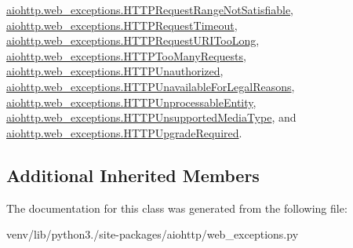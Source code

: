 \hyperlink{classaiohttp_1_1web__exceptions_1_1_h_t_t_p_request_range_not_satisfiable}{aiohttp.\+web\+\_\+exceptions.\+H\+T\+T\+P\+Request\+Range\+Not\+Satisfiable}, \hyperlink{classaiohttp_1_1web__exceptions_1_1_h_t_t_p_request_timeout}{aiohttp.\+web\+\_\+exceptions.\+H\+T\+T\+P\+Request\+Timeout}, \hyperlink{classaiohttp_1_1web__exceptions_1_1_h_t_t_p_request_u_r_i_too_long}{aiohttp.\+web\+\_\+exceptions.\+H\+T\+T\+P\+Request\+U\+R\+I\+Too\+Long}, \hyperlink{classaiohttp_1_1web__exceptions_1_1_h_t_t_p_too_many_requests}{aiohttp.\+web\+\_\+exceptions.\+H\+T\+T\+P\+Too\+Many\+Requests}, \hyperlink{classaiohttp_1_1web__exceptions_1_1_h_t_t_p_unauthorized}{aiohttp.\+web\+\_\+exceptions.\+H\+T\+T\+P\+Unauthorized}, \hyperlink{classaiohttp_1_1web__exceptions_1_1_h_t_t_p_unavailable_for_legal_reasons}{aiohttp.\+web\+\_\+exceptions.\+H\+T\+T\+P\+Unavailable\+For\+Legal\+Reasons}, \hyperlink{classaiohttp_1_1web__exceptions_1_1_h_t_t_p_unprocessable_entity}{aiohttp.\+web\+\_\+exceptions.\+H\+T\+T\+P\+Unprocessable\+Entity}, \hyperlink{classaiohttp_1_1web__exceptions_1_1_h_t_t_p_unsupported_media_type}{aiohttp.\+web\+\_\+exceptions.\+H\+T\+T\+P\+Unsupported\+Media\+Type}, and \hyperlink{classaiohttp_1_1web__exceptions_1_1_h_t_t_p_upgrade_required}{aiohttp.\+web\+\_\+exceptions.\+H\+T\+T\+P\+Upgrade\+Required}.

\subsection*{Additional Inherited Members}


The documentation for this class was generated from the following file\+:\begin{DoxyCompactItemize}
\item 
venv/lib/python3./site-\/packages/aiohttp/web\+\_\+exceptions.\+py\end{DoxyCompactItemize}
